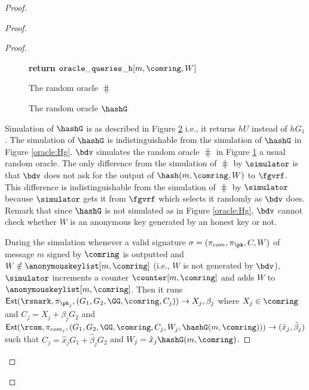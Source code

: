 \begin{proof}
\begin{proof}
\begin{proof}
\begin{figure}
{{						
						\textbf{return $  \mathtt{oracle\_queries\_h}[m, \comring, W] $}
						
				}}	
				\caption{The random oracle $ \hash $}
				\label{oracle:HbyB}
			\end{figure}
			
			\begin{figure}
				\centering
				
				\noindent{}	
				\caption{The random oracle $ \hashG $}
				\label{oracle:HgbyB}
			\end{figure}
			
			Simulation of $ \hashG $ is as described in Figure \ref{oracle:HgbyB} i.e., it returns $ hU $ instead of $ hG_1 $. The simulation of $ \hashG $ is indistinguishable from the simulation of $ \hashG $ in Figure \ref{oracle:Hg}. 
			$ \bdv $ simulates the random oracle $ \hash $ in Figure \ref{oracle:HbyB} a usual random oracle. The only difference from the simulation of $ \hash $ by $ \simulator $ is that $ \bdv $ does not ask for the output of $ \hash(m,\comring,W) $ to $ \fgvrf $. This difference is indistinguishable from the simulation of $ \hash $ by $ \simulator $ because $ \simulator $ gets it from $ \fgvrf $ which selects it randomly as $ \bdv  $ does. Remark that since $ \hashG $ is not simulated as in Figure \ref{oracle:Hg}, $ \bdv $ cannot check whether $ W $ is an anonymous key generated by an honest key or not.  
			
			During the simulation whenever a valid signature $ \sigma = (\pi_{com},\pi_{\pk},C,W) $ of message $ m $ signed by $ \comring $ is outputted and $ W \notin \anonymouskeylist[m,\comring] $ (i.e., $ W $ is not generated by $ \bdv $), $ \simulator $ increments a counter $ \counter[m,\comring] $ and adds $ W $ to $ \anonymouskeylist[m,\comring] $.
			Then it runs $ \mathsf{Ext}(\rsnark,\pi_{\pk_j},(G_1,G_2, \GG,\comring, C_j) ) \rightarrow X_j, \beta_j$ where $ X_j\in \comring $ and $ C_j = X_j + \beta_j G_2 $ and $ \mathsf{Ext}(\rcom,\pi_{com_j},(G_1,G_2, \GG,\comring, C_j,W_j,\hashG(m,\comring))) \rightarrow (\hat{x}_j,\hat{\beta}_j )$ such that $ C_j = \hat{x}_jG_1 + \hat{\beta}_j G_2 $ and $ W_j = \hat{x}_j \hashG(m,\comring) $. 
			

\end{proof}
\end{proof}
\end{proof}
